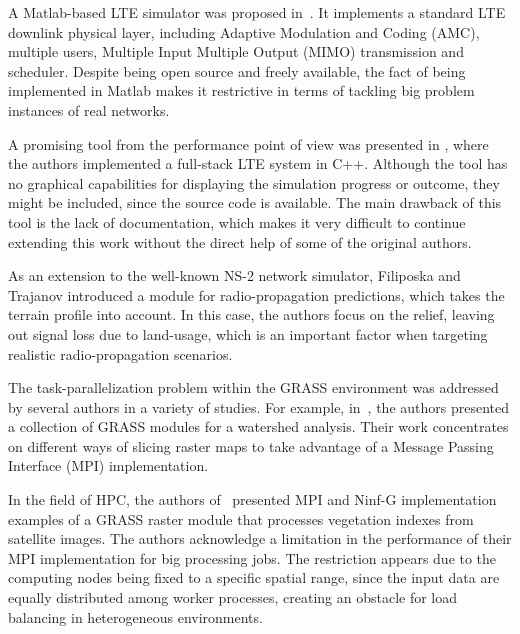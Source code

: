 A Matlab-based LTE simulator was proposed in~\cite{Mehlfuhrer_The_Vienna_LTE_Simulators_enabling_reproducibility_in_wireless_communications_research:2011}.
It implements a standard LTE downlink physical layer, including Adaptive
Modulation and Coding (AMC),
multiple users, Multiple Input Multiple Output (MIMO)
transmission and scheduler. Despite being open source and freely available,
the fact of being implemented in Matlab makes it restrictive in terms
of tackling big problem instances of real networks.

A promising tool from the performance point of view was presented
in \cite{Piro_Simulating_LTE_cellular_systems_an_open_source_framework:2011},
where the authors implemented a full-stack LTE system in C++. Although
the tool has no graphical capabilities for displaying the simulation
progress or outcome, they might be included, since the source code
is available. The main drawback of this tool is the lack of documentation,
which makes it very difficult to continue extending this work without
the direct help of some of the original authors.

As an extension to the well-known NS-2 network simulator, Filiposka
and Trajanov \cite{Filiposka_Terrain_aware_three_dimensional_radio_propagation_model_extension_for_NS2:2011}
introduced a module for radio-propagation predictions, which takes
the terrain profile into account. In this case, the authors focus
on the relief, leaving out signal loss due to land-usage, which is
an important factor when targeting realistic radio-propagation scenarios.

\bigskip{}


The task-parallelization problem within the GRASS environment was
addressed by several authors in a variety of studies. For example,
in~\cite{Campos_Parallel_modelling_in_GIS:2012}, the authors presented
a collection of GRASS modules for a watershed analysis. Their work
concentrates on different ways of slicing raster maps to take advantage
of a Message Passing Interface (MPI)
implementation.

In the field of HPC, the authors of~\cite{Akhter-GRASS_GIS_on_high_performance_computing_with_MPI_OpenMP_and_Ninf-G:2010}
presented MPI and Ninf-G implementation examples of a GRASS raster
module that processes vegetation indexes from satellite images. The
authors acknowledge a limitation in the performance of their MPI implementation
for big processing jobs. The restriction appears due to the computing
nodes being fixed to a specific spatial range, since the input data
are equally distributed among worker processes, creating an obstacle
for load balancing in heterogeneous environments.

